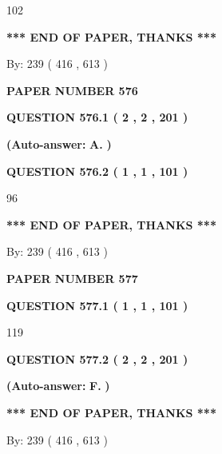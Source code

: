 \documentclass{ctexart}
\begin{document}
102
   
   
   
   
\vspace{1.0in} 
{\textbf{\large{ *** END OF PAPER, THANKS *** }}} 
   
   
\hspace{1.0in} By: 
 239 ( 416 ,  613 )
   
   
   
   
\newpage 
\setcounter{page}{ 
   576001 } 
   
   
 {\textbf{ \Large{ PAPER NUMBER  576  }}}
   
   
   
   
  
  
{\textbf{\large{QUESTION
576.1 
 ( 2 , 2 , 201 )
}}}
 
 
{\textbf{(Auto-answer:}}
{\textbf{\large{
A.}}}
{\textbf{)}}
 
 
  
  
{\textbf{\large{QUESTION
576.2 
 ( 1 , 1 , 101 )
}}}

96
   
   
   
   
\vspace{1.0in} 
{\textbf{\large{ *** END OF PAPER, THANKS *** }}} 
   
   
\hspace{1.0in} By: 
 239 ( 416 ,  613 )
   
   
   
   
\newpage 
\setcounter{page}{ 
   577001 } 
   
   
 {\textbf{ \Large{ PAPER NUMBER  577  }}}
   
   
   
   
  
  
{\textbf{\large{QUESTION
577.1 
 ( 1 , 1 , 101 )
}}}

119
  
  
{\textbf{\large{QUESTION
577.2 
 ( 2 , 2 , 201 )
}}}
 
 
{\textbf{(Auto-answer:}}
{\textbf{\large{
F.}}}
{\textbf{)}}
 
 
   
   
   
   
\vspace{1.0in} 
{\textbf{\large{ *** END OF PAPER, THANKS *** }}} 
   
   
\hspace{1.0in} By: 
 239 ( 416 ,  613 )
   
   
   
   
\newpage 
\setcounter{page}{ 
   578001 } 
   
\end{document}

